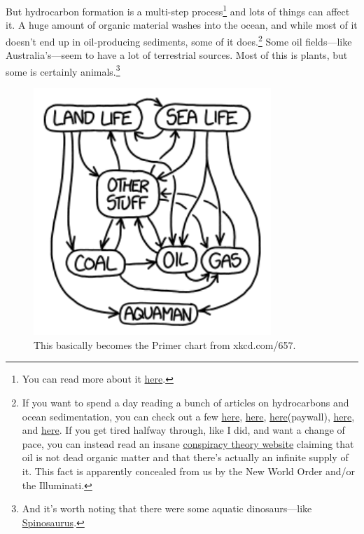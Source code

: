 {{But hydrocarbon formation is a multi-step process{\footnote{You can read more about it \href{http://www.ems.psu.edu/\~pisupati/ACSOutreach/Petroleum\_2.html}{here}.} } and lots of things can affect it. A huge amount of organic material washes into the ocean, and while most of it doesn't end up in oil-producing sediments, some of it does.{\footnote{If you want to spend a day reading a bunch of articles on hydrocarbons and ocean sedimentation, you can check out a few \href{http://booksite.elsevier.com/9780120885305/casestudies/01-Ch26-P088530web.pdf}{here}, \href{http://www.msci.sc.edu/sites/default/files/images/pictures/Benner/docs/Hedges\%20et\%20al\%20OrgGeo\%201997.pdf}{here}, \href{http://archives.datapages.com/data/circ\_pac/0011/0807\_f.htm}{here}(paywall), \href{http://dnr.louisiana.gov/assets/TAD/education/BGBB/3/origin.html}{here}, and \href{http://www.whoi.edu/cms/files/goni\_et\_al\_Nature\_1997\_35805.pdf}{here}. If you get tired halfway through, like I did, and want a change of pace, you can instead read an insane \href{http://www.cuttingedge.org/News/n2268.cfm}{conspiracy theory website} claiming that oil is not dead organic matter and that there's actually an infinite supply of it. This fact is apparently concealed from us by the New World Order and/or the Illuminati.} } Some oil fields—like Australia's—seem to have a lot of terrestrial sources. Most of this is plants, but some is certainly animals.{\footnote{And it's worth noting that there were some aquatic dinosaurs—like \href{https://en.wikipedia.org/wiki/Spinosaurus} {Spinosaurus}.} } }

\begin{figure}[!htbp]
\centering
\includegraphics[scale=0.5, max width=0.8\textwidth]{imgs/a/101/cog2.png}
\caption{This basically becomes the Primer chart from xkcd.com/657.}
\end{figure}

}

